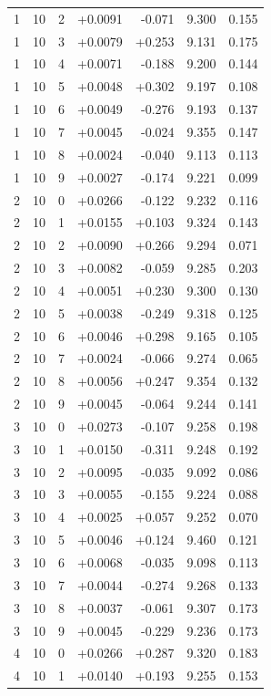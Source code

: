 \documentclass[10pt]{article}
\begin{document}
\begin{longtable}{llrrrrr}
1 & 10 & 2 & +0.0091 & -0.071 & 9.300 & 0.155 \\
1 & 10 & 3 & +0.0079 & +0.253 & 9.131 & 0.175 \\
1 & 10 & 4 & +0.0071 & -0.188 & 9.200 & 0.144 \\
1 & 10 & 5 & +0.0048 & +0.302 & 9.197 & 0.108 \\
1 & 10 & 6 & +0.0049 & -0.276 & 9.193 & 0.137 \\
1 & 10 & 7 & +0.0045 & -0.024 & 9.355 & 0.147 \\
1 & 10 & 8 & +0.0024 & -0.040 & 9.113 & 0.113 \\
1 & 10 & 9 & +0.0027 & -0.174 & 9.221 & 0.099 \\
2 & 10 & 0 & +0.0266 & -0.122 & 9.232 & 0.116 \\
2 & 10 & 1 & +0.0155 & +0.103 & 9.324 & 0.143 \\
2 & 10 & 2 & +0.0090 & +0.266 & 9.294 & 0.071 \\
2 & 10 & 3 & +0.0082 & -0.059 & 9.285 & 0.203 \\
2 & 10 & 4 & +0.0051 & +0.230 & 9.300 & 0.130 \\
2 & 10 & 5 & +0.0038 & -0.249 & 9.318 & 0.125 \\
2 & 10 & 6 & +0.0046 & +0.298 & 9.165 & 0.105 \\
2 & 10 & 7 & +0.0024 & -0.066 & 9.274 & 0.065 \\
2 & 10 & 8 & +0.0056 & +0.247 & 9.354 & 0.132 \\
2 & 10 & 9 & +0.0045 & -0.064 & 9.244 & 0.141 \\
3 & 10 & 0 & +0.0273 & -0.107 & 9.258 & 0.198 \\
3 & 10 & 1 & +0.0150 & -0.311 & 9.248 & 0.192 \\
3 & 10 & 2 & +0.0095 & -0.035 & 9.092 & 0.086 \\
3 & 10 & 3 & +0.0055 & -0.155 & 9.224 & 0.088 \\
3 & 10 & 4 & +0.0025 & +0.057 & 9.252 & 0.070 \\
3 & 10 & 5 & +0.0046 & +0.124 & 9.460 & 0.121 \\
3 & 10 & 6 & +0.0068 & -0.035 & 9.098 & 0.113 \\
3 & 10 & 7 & +0.0044 & -0.274 & 9.268 & 0.133 \\
3 & 10 & 8 & +0.0037 & -0.061 & 9.307 & 0.173 \\
3 & 10 & 9 & +0.0045 & -0.229 & 9.236 & 0.173 \\
4 & 10 & 0 & +0.0266 & +0.287 & 9.320 & 0.183 \\
4 & 10 & 1 & +0.0140 & +0.193 & 9.255 & 0.153 \\

\end{longtable}
\end{document}
